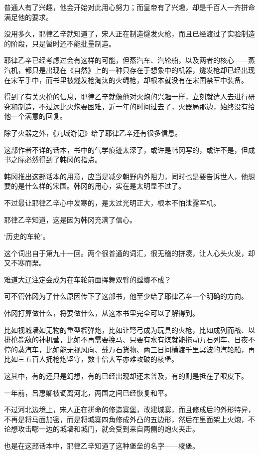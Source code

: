 普通人有了兴趣，他会开始对此用心努力；而皇帝有了兴趣，却是千百人一齐拼命满足他的要求。

没用多久，耶律乙辛就知道了，宋人正在制造燧发火枪，而且已经渡过了实验制造的阶段，只是暂时还不能批量制造。

耶律乙辛已经考虑过会有这样的可能，但蒸汽车、汽轮船，以及两者的核心——蒸汽机，都只是出现在《自然》上的一种只存在于想象中的机器，燧发枪却已经出现在宋军手中，而书里被燧发枪淘汰的火绳枪，却根本就没有在宋国禁军中装备。

得到了有关火枪的信息，耶律乙辛就像他对火炮的兴趣一样，立刻就遣人去进行研究和制造，不过远比火炮要困难，近一年的时间过去了，火器局那边，始终没有给他一个满意的回复。

除了火器之外，《九域游记》给了耶律乙辛还有很多信息。

这部作者不详的话本，书中的气学痕迹太深了，或许是韩冈写的，或许不是，但成书之际必然得到了韩冈的指点。

韩冈推出这部话本的用意，应当是减少朝野内外阻力，同时也是要告诉世人，他想要的是什么样的宋国。韩冈的用心，实在是太明显不过了。

不过最让耶律乙辛心中发寒的，是太过光明正大，根本不怕泄露军机。

耶律乙辛知道，这是因为韩冈充满了信心。

‘历史的车轮’。

这个词出自于第九十一回。两个很普通的词汇，很无稽的拼凑，让人心头火发，却又不寒而栗。

难道大辽注定会成为在车轮前面挥舞双臂的螳螂不成？

可不管韩冈为了什么原因传下了这部书，他至少给了耶律乙辛一个明确的方向。

韩冈打算做什么，将要做什么，从这本书里完全可以了解得到。

比如视城墙如无物的重型榴弹炮，比如让弩弓成为玩具的火枪，比如成列而战、以排枪毙敌的神机营，比如不再需要挽马、只要有水有煤就能拖动万石列车、日夜不停的蒸汽车，比如能无视风向、载万石货物、两三日间横渡千里冥波的汽轮船，再比如三五百人拥枪炮坚守，数十倍大军亦难攻破的棱堡。

这其中，有的还只是幻想，有的已经出现却还未普及，有的则是抵在了眼皮下。

一年前，吕惠卿被调离河北，两国之间已经恢复和平。

不过河北边境上，宋人正在拼命的修造寨堡，改建城寨，而且修成后的外形特异，不再是将马面加密，而是将城寨四角修成外凸的五边形，然后在里面架上火炮，不论想攻击哪一边的城墙和城门，就会受到来自两侧的炮火夹击。

也是在这部话本中，耶律乙辛知道了这种堡垒的名字——棱堡。

